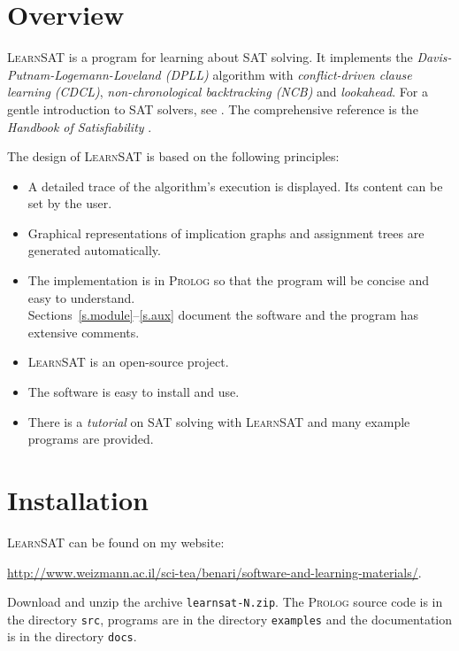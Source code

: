 \documentclass[11pt]{article}
\newcommand*{\p}[1]{\textup{\texttt{#1}}}
\newcommand*{\ls}{\textsc{LearnSAT}}
\newcommand*{\pl}{\textsc{Prolog}}
\begin{document}
\section{Overview}

\ls{} is a program for learning about SAT solving. It implements the \emph{Davis-Putnam-Logemann-Loveland (DPLL)} algorithm with \emph{conflict-driven clause learning (CDCL)}, \emph{non-chronological backtracking (NCB)} and \emph{lookahead}. For a gentle introduction to SAT solvers, see \cite[Chapter~6]{mlcs}. The comprehensive reference is the \emph{Handbook of Satisfiability} \cite{SAT}.

The design of \ls{} is based on the following principles:

\begin{itemize}

\item A detailed trace of the algorithm's execution is
displayed. Its content can be set by the user.

\item Graphical representations of implication graphs and assignment
trees are generated automatically.

\item The implementation is in \pl{} so that the program will be concise and easy to understand.\\
Sections~\ref{s.module}--\ref{s.aux} document the software and the program has extensive comments. 

\item \ls{} is an open-source project.

\item The software is easy to install and use.

\item There is a \emph{tutorial} on SAT solving with \ls{} and many example programs are provided.
\end{itemize}

\section{Installation}

\ls{} can be found on my website:
\begin{center}
\url{http://www.weizmann.ac.il/sci-tea/benari/software-and-learning-materials/}.
\end{center}

Download and unzip the archive \p{learnsat-N.zip}. The \pl{} source code
is in the directory \p{src}, programs are in the directory \p{examples} and the documentation is in the directory \p{docs}.
\end{document}
